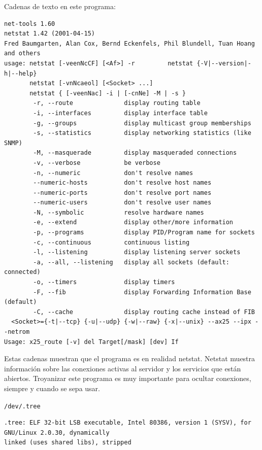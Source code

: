 \vspace{1em}

 Cadenas de texto en este programa:
 
\vspace{1em}

\begin{lstlisting}[style=terminal]
net-tools 1.60
netstat 1.42 (2001-04-15)
Fred Baumgarten, Alan Cox, Bernd Eckenfels, Phil Blundell, Tuan Hoang and others
usage: netstat [-veenNcCF] [<Af>] -r         netstat {-V|--version|-h|--help}
       netstat [-vnNcaeol] [<Socket> ...]
       netstat { [-veenNac] -i | [-cnNe] -M | -s }
        -r, --route              display routing table
        -i, --interfaces         display interface table
        -g, --groups             display multicast group memberships
        -s, --statistics         display networking statistics (like SNMP)
        -M, --masquerade         display masqueraded connections
        -v, --verbose            be verbose
        -n, --numeric            don't resolve names
        --numeric-hosts          don't resolve host names
        --numeric-ports          don't resolve port names
        --numeric-users          don't resolve user names
        -N, --symbolic           resolve hardware names
        -e, --extend             display other/more information
        -p, --programs           display PID/Program name for sockets
        -c, --continuous         continuous listing
        -l, --listening          display listening server sockets
        -a, --all, --listening   display all sockets (default: connected)
        -o, --timers             display timers
        -F, --fib                display Forwarding Information Base (default)
        -C, --cache              display routing cache instead of FIB
  <Socket>={-t|--tcp} {-u|--udp} {-w|--raw} {-x|--unix} --ax25 --ipx --netrom
Usage: x25_route [-v] del Target[/mask] [dev] If
\end{lstlisting}

\vspace{1em}

 Estas cadenas muestran que el programa es en realidad netstat. Netstat
muestra información sobre las conexiones activas al servidor y los
servicios que están abiertos. Troyanizar este programa es muy
importante para ocultar conexiones, siempre y cuando se sepa usar.

\texttt{/dev/.tree}

\vspace{1em}

\begin{lstlisting}[style=terminal]
.tree: ELF 32-bit LSB executable, Intel 80386, version 1 (SYSV), for GNU/Linux 2.0.30, dynamically 
linked (uses shared libs), stripped
\end{lstlisting}

